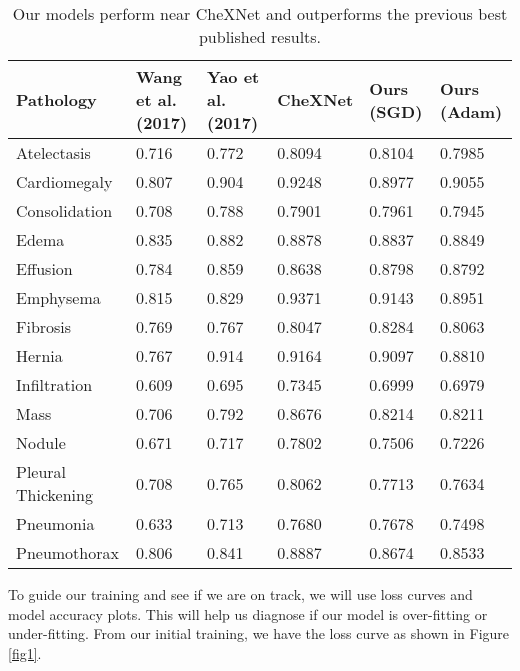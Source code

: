 \documentclass{amia}
\begin{document}
\begin{table}[]
\begin{tabular}{p{3cm}|p{2cm}|p{2cm}|p{2cm}|p{2cm}|p{2cm}}
\toprule
Pathology          & Wang et al. (2017) & Yao et al. (2017) & CheXNet & Ours (SGD) & Ours (Adam) \\ \midrule
Atelectasis        & 0.716              & 0.772             & 0.8094  & 0.8104     & 0.7985      \\
Cardiomegaly       & 0.807              & 0.904             & 0.9248  & 0.8977     & 0.9055      \\
Consolidation      & 0.708              & 0.788             & 0.7901  & 0.7961     & 0.7945      \\
Edema              & 0.835              & 0.882             & 0.8878  & 0.8837     & 0.8849      \\
Effusion           & 0.784              & 0.859             & 0.8638  & 0.8798     & 0.8792      \\
Emphysema          & 0.815              & 0.829             & 0.9371  & 0.9143     & 0.8951      \\
Fibrosis           & 0.769              & 0.767             & 0.8047  & 0.8284     & 0.8063      \\
Hernia             & 0.767              & 0.914             & 0.9164  & 0.9097     & 0.8810      \\
Infiltration       & 0.609              & 0.695             & 0.7345  & 0.6999     & 0.6979      \\
Mass               & 0.706              & 0.792             & 0.8676  & 0.8214     & 0.8211      \\
Nodule             & 0.671              & 0.717             & 0.7802  & 0.7506     & 0.7226      \\
Pleural Thickening & 0.708              & 0.765             & 0.8062  & 0.7713     & 0.7634      \\
Pneumonia          & 0.633              & 0.713             & 0.7680  & 0.7678     & 0.7498      \\
Pneumothorax       & 0.806              & 0.841             & 0.8887  & 0.8674     & 0.8533      \\ \bottomrule
\end{tabular}
\caption{Our models perform near CheXNet and outperforms the previous best published results.}
\end{table}

To guide our training and see if we are on track, we will use loss curves and model accuracy plots. This will help us diagnose if our model is over-fitting or under-fitting. From our initial training, we have the loss curve as shown in Figure \ref{fig1}.
\end{document}
